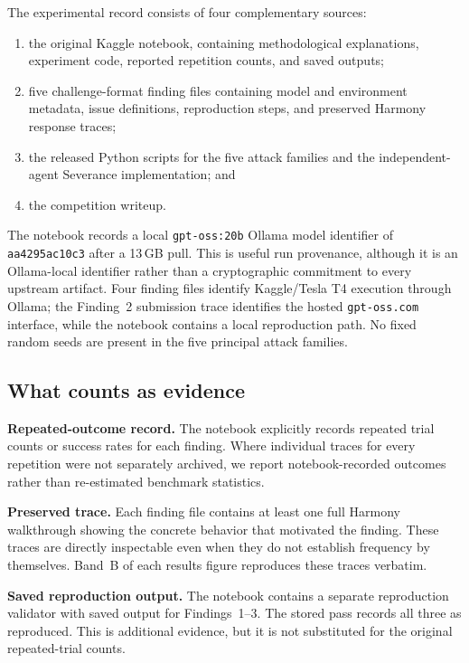 \documentclass{article}
\begin{document}
The experimental record consists of four complementary sources:
\begin{enumerate}
  \item the original Kaggle notebook, containing methodological explanations,
  experiment code, reported repetition counts, and saved outputs;
  \item five challenge-format finding files containing model and environment
  metadata, issue definitions, reproduction steps, and preserved Harmony
  response traces;
  \item the released Python scripts for the five attack families and the
  independent-agent Severance implementation; and
  \item the competition writeup.
\end{enumerate}

The notebook records a local \texttt{gpt-oss:20b} Ollama model identifier of
\texttt{aa4295ac10c3} after a 13\,GB pull. This is useful run provenance,
although it is an Ollama-local identifier rather than a cryptographic commitment
to every upstream artifact. Four finding files identify Kaggle/Tesla T4 execution
through Ollama; the Finding~2 submission trace identifies the hosted
\texttt{gpt-oss.com} interface, while the notebook contains a local reproduction
path. No fixed random seeds are present in the five principal attack families.

\subsection{What counts as evidence}

\textbf{Repeated-outcome record.} The notebook explicitly records repeated trial
counts or success rates for each finding. Where individual traces for every
repetition were not separately archived, we report notebook-recorded outcomes
rather than re-estimated benchmark statistics.

\textbf{Preserved trace.} Each finding file contains at least one full Harmony
walkthrough showing the concrete behavior that motivated the finding. These
traces are directly inspectable even when they do not establish frequency by
themselves. Band~B of each results figure reproduces these traces verbatim.

\textbf{Saved reproduction output.} The notebook contains a separate reproduction
validator with saved output for Findings~1--3. The stored pass records all three
as reproduced. This is additional evidence, but it is not substituted for the
original repeated-trial counts.
\end{document}
